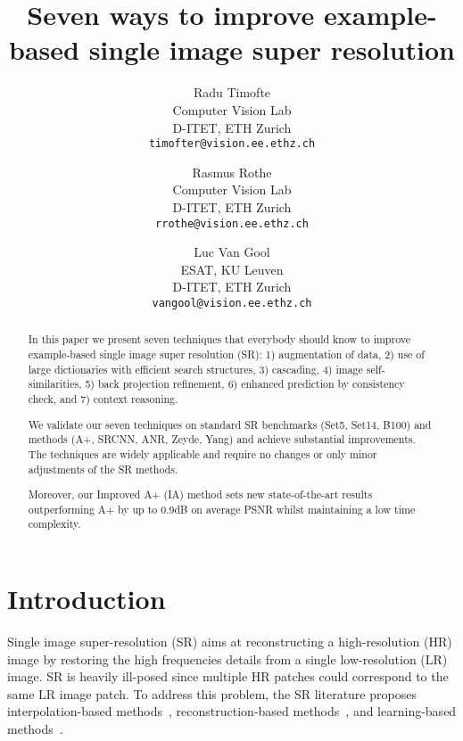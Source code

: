 \documentclass[10pt,twocolumn,letterpaper]{article}
\begin{document}
\title{Seven ways to improve example-based single image super resolution}

\author{Radu Timofte\\
Computer Vision Lab\\
D-ITET, ETH Zurich\\
{\tt\small timofter@vision.ee.ethz.ch}
\and
Rasmus Rothe\\
Computer Vision Lab\\
D-ITET, ETH Zurich\\
{\tt\small rrothe@vision.ee.ethz.ch}
\and
Luc Van Gool\\
ESAT, KU Leuven\\
D-ITET, ETH Zurich\\
{\tt\small vangool@vision.ee.ethz.ch}
}
\maketitle



\begin{abstract}
In this paper we present seven techniques that everybody should know to improve example-based single image super resolution (SR): 1) augmentation of data, 2) use of large dictionaries with efficient search structures, 3) cascading, 4) image self-similarities, 5) back projection refinement, 6) enhanced prediction by consistency check, and 7) context reasoning.

We validate our seven techniques on standard SR benchmarks (\ie Set5, Set14, B100) and methods (\ie A+, SRCNN, ANR, Zeyde, Yang) and achieve substantial improvements.
The techniques are widely applicable and require no changes or only minor adjustments of the SR methods. 

Moreover, our Improved A+ (IA) method sets new state-of-the-art results outperforming A+ by up to 0.9dB on average PSNR whilst maintaining a low time complexity.
\end{abstract}

\section{Introduction}

Single image super-resolution (SR) aims at reconstructing a high-resolution (HR) image by restoring the high frequencies details from a single low-resolution (LR) image.
SR is heavily ill-posed since multiple HR patches could correspond to the same LR image patch.
To address this problem, the SR literature proposes interpolation-based methods~\cite{Thevenaz-BOOK-2000}, reconstruction-based methods~\cite{Chang-CVPR-2004,Glasner-ICCV-2009,Protter-TIP-2009,Yang-TIP-2010,Zeyde-CS-2012}, and learning-based methods~\cite{Kim-PAMI-2010,Dong-TIP-2011,Timofte-ICCV-2013,Timofte-ACCV-2014,Dong-ECCV-2014,Zhang-TIP-2015,Dai-EG-2015}.
\end{document}
